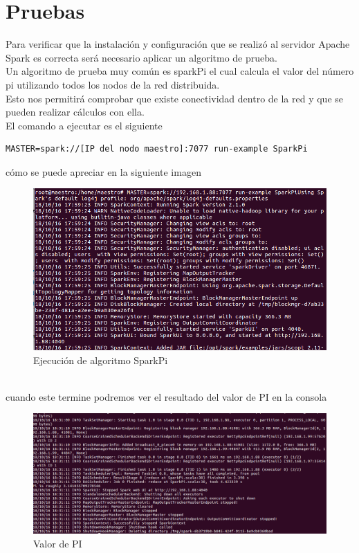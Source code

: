 \section{Pruebas}\label{seccion4}
Para verificar que la instalación y configuración que se realizó al servidor Apache Spark es correcta será necesario aplicar un algoritmo de prueba. 
\\
Un algoritmo de prueba muy común es sparkPi el cual calcula el valor del número pi utilizando todos los nodos de la red distribuida. 
\\
Esto nos permitirá comprobar que existe conectividad dentro de la red y que se pueden realizar cálculos con ella.
\\
El comando a ejecutar es el siguiente 
\begin{lstlisting} 
MASTER=spark://[IP del nodo maestro]:7077 run-example SparkPi
\end{lstlisting}
cómo se puede apreciar en la siguiente imagen \\
\begin{figure}[!htbp]
	\hypertarget{fig:red4}{\hspace{1pt}}
	\begin{center}
		\includegraphics[width=.7\textwidth]{capitulo3/images/im9.png}
		\caption{Ejecución de algoritmo SparkPi}
		\label{fig:red4}
	\end{center}
\end{figure}
\\ cuando este termine podremos ver el resultado del valor de PI en la consola \\
\begin{figure}[!htbp]
	\hypertarget{fig:red5}{\hspace{1pt}}
	\begin{center}
		\includegraphics[width=.7\textwidth]{capitulo3/images/im12.png}
		\caption{Valor de PI}
		\label{fig:red5}
	\end{center}
\end{figure}
